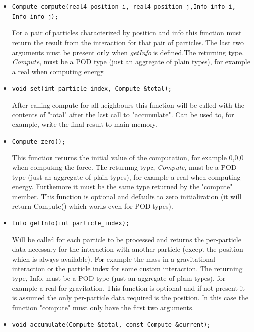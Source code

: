 \documentclass[twoside,openright,titlepage,numbers=noenddot,%
headinclude,footinclude,cleardoublepage=empty,abstract=on,
BCOR=5mm,fontsize=11pt, dvipsnames, paper=b5
]{scrreprt}
\def\ucpp{uammd_cpp_lexer.py:UAMMDCppLexer -x}
\begin{document}
\begin{itemize}
\item \texttt{Compute compute(real4 position_i, real4 position_j,Info info_i, Info info_j);}

  
  For a pair of particles
  characterized by position and info this function must return the
  result from the interaction for that pair of particles. The last
  two arguments must be present only when \emph{getInfo} is defined.The
  returning type, \emph{Compute}, must be a POD type (just an aggregate of
  plain types), for example a real when computing energy.

\item \texttt{void set(int particle_index, Compute &total);}

  
   After calling compute for all neighbours this function will be called with the contents of "total" after the last call to "accumulate".
   Can be used to, for example, write the final result to main memory.

 \item \texttt{Compute zero();}

   
   This function returns the initial value of the computation, for example {0,0,0} when computing the force. 
   The returning type, \emph{Compute}, must be a POD type (just an aggregate of plain types), for example a real when computing energy. Furthemore it must be the same type returned by the "compute" member.
   This function is optional and defaults to zero initialization (it will return Compute() which works even for POD types).
    
 \item \texttt{Info getInfo(int particle_index);}

   
   Will be called for each particle to be processed and returns the per-particle data necessary for the interaction with another particle (except the position which is always available). For example the mass in a gravitational interaction or the particle index for some custom interaction.
   The returning type, Info, must be a POD type (just an aggregate of plain types), for example a real for gravitation.
   This function is optional and if not present it is assumed the only per-particle data required is the position. 
   In this case the function "compute" must only have the first two arguments.

 \item \texttt{void accumulate(Compute &total, const Compute &current);}


\end{itemize}
\end{document}

